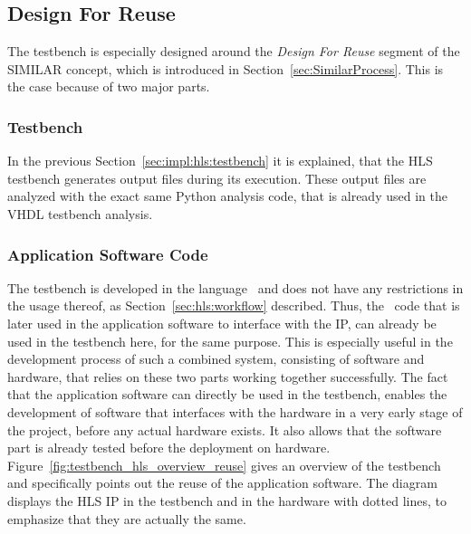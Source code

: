 \subsection{Design For Reuse}

The testbench is especially designed around the \textit{Design For Reuse} segment of the \mbox{SIMILAR} concept, which is introduced in Section~\ref{sec:SimilarProcess}.
This is the case because of two major parts.

\subsubsection{Testbench}

In the previous Section~\ref{sec:impl:hls:testbench} it is explained, that the HLS testbench generates output files during its execution.
These output files are analyzed with the exact same Python analysis code, that is already used in the VHDL testbench analysis.

\subsubsection{Application Software Code}

The testbench is developed in the language \cplusplus\ and does not have any restrictions in the usage thereof, as Section~\ref{sec:hls:workflow} described.
Thus, the \cplusplus\ code that is later used in the application software to interface with the IP, can already be used in the testbench here, for the same purpose.
This is especially useful in the development process of such a combined system, consisting of software and hardware, that relies on these two parts working together successfully.
The fact that the application software can directly be used in the testbench, enables the development of software that interfaces with the hardware in a very early stage of the project, before any actual hardware exists.
It also allows that the software part is already tested before the deployment on hardware.\\

Figure~\ref{fig:testbench_hls_overview_reuse} gives an overview of the testbench and specifically points out the reuse of the application software.
The diagram displays the HLS IP in the testbench and in the hardware with dotted lines, to emphasize that they are actually the same.\\

